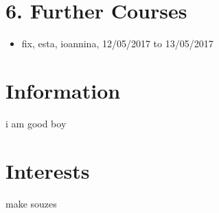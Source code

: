\documentclass{article}
\begin{document}
 \section{6. Further Courses} 
\begin{itemize} 
\item {fix, esta, ioannina, 12/05/2017 to 13/05/2017}
\end{itemize} 
 \section{Information} 
 {i am good boy}
 \section{Interests} 
 {make souzes}
\end{document}
